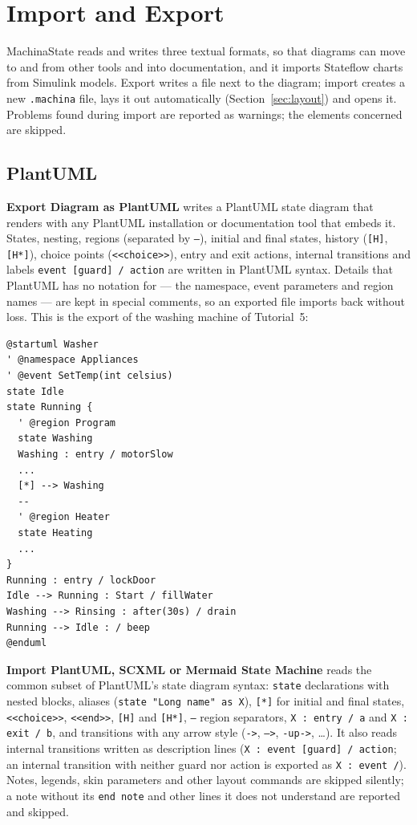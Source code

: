 \documentclass[11pt,a4paper,openany]{report}
\newcommand{\ui}[1]{\textsf{\textbf{#1}}}
\newcommand{\code}[1]{\texttt{#1}}
\begin{document}
\chapter{Import and Export}
\label{ch:interop}

MachinaState reads and writes three textual formats, so that diagrams can move to and from other tools
and into documentation, and it imports Stateflow charts from Simulink models. Export writes a file next
to the diagram; import creates a new \code{.machina} file, lays it out automatically
(Section~\ref{sec:layout}) and opens it. Problems found during import are reported as warnings; the
elements concerned are skipped.

\section{PlantUML}
\ui{Export Diagram as PlantUML} writes a PlantUML state diagram that renders with any PlantUML
installation or documentation tool that embeds it. States, nesting, regions (separated by \code{--}),
initial and final states, history (\code{[H]}, \code{[H*]}), choice points (\code{<<choice>>}),
entry and exit actions, internal transitions and labels \code{event [guard] / action} are written in
PlantUML syntax. Details that PlantUML has no notation for --- the namespace, event parameters and
region names --- are kept in special comments, so an exported file imports back without loss.
This is the export of the washing machine of Tutorial~5:
\begin{lstlisting}
@startuml Washer
' @namespace Appliances
' @event SetTemp(int celsius)
state Idle
state Running {
  ' @region Program
  state Washing
  Washing : entry / motorSlow
  ...
  [*] --> Washing
  --
  ' @region Heater
  state Heating
  ...
}
Running : entry / lockDoor
Idle --> Running : Start / fillWater
Washing --> Rinsing : after(30s) / drain
Running --> Idle : / beep
@enduml
\end{lstlisting}
\ui{Import PlantUML, SCXML or Mermaid State Machine} reads the common subset of PlantUML's state diagram
syntax: \code{state} declarations with nested blocks, aliases (\code{state "Long name" as X}),
\code{[*]} for initial and final states, \code{<<choice>>}, \code{<<end>>}, \code{[H]} and
\code{[H*]}, \code{--} region separators, \code{X : entry / a} and \code{X : exit / b}, and transitions
with any arrow style (\code{->}, \code{-->}, \code{-up->}, \dots). It also reads internal transitions
written as description lines (\code{X : event [guard] / action}; an internal transition with neither
guard nor action is exported as \code{X : event /}). Notes, legends, skin parameters and other layout
commands are skipped silently; a note without its \code{end note} and other lines it does not
understand are reported and skipped.
\end{document}
